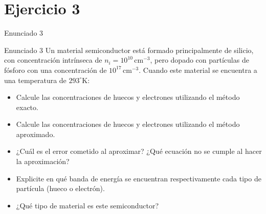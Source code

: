 \documentclass[
    10pt,
    aspectratio=169,
    xcolor={dvipsnames},
    spanish,
    ]{beamer}
\begin{document}
\section{Ejercicio 3}
\begin{frame}{Enunciado 3}
  \begin{block}{Enunciado 3}
    Un material semiconductor está formado principalmente de silicio, con concentración intrínseca de $n_i = 10^{10}\,\text{cm}^{-3}$, pero dopado con partículas de fósforo con una concentración de $10^{17}\,\text{cm}^{-3}$. Cuando este material se encuentra a una temperatura de $293^\circ \text{K}$:
\begin{itemize}
    \item Calcule las concentraciones de huecos y electrones utilizando el método exacto.
    \item Calcule las concentraciones de huecos y electrones utilizando el método aproximado.
    \item ¿Cuál es el error cometido al aproximar? ¿Qué ecuación no se cumple al hacer la aproximación?
    \item Explicite en qué banda de energía se encuentran respectivamente cada tipo de partícula (hueco o electrón).
    \item ¿Qué tipo de material es este semiconductor?
\end{itemize}
\end{block}
\end{frame}
\end{document}

